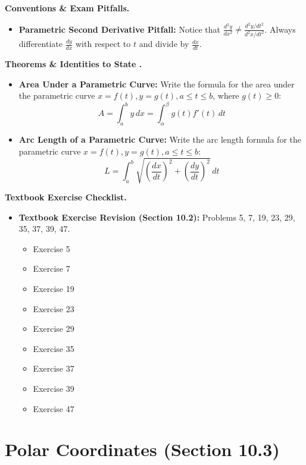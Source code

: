 \documentclass{../../../templates/natsirt}
\newcounter{topic}[section]
\newenvironment{theoremsbox}[1][]{%
    \begin{greenbox}[#1]\refstepcounter{topic}\textbf{Theorems \& Identities to State \thesection.\thetopic}%
}{\end{greenbox}}
\newenvironment{warningbox}[1][]{\begin{whitebox}[#1]\textbf{Conventions \& Exam Pitfalls. }}{\end{whitebox}}
\newenvironment{reviewbox}[1][]{\begin{whitebox}[#1]\textbf{Textbook Exercise Checklist. }}{\end{whitebox}}
\newcommand{\citem}{\item[$\square$]}
\begin{document}
\begin{warningbox}
    \begin{itemize}
        \citem \textbf{Parametric Second Derivative Pitfall:} Notice that $\frac{d^2y}{dx^2} \neq \frac{d^2y/dt^2}{d^2x/dt^2}$. Always differentiate $\frac{dy}{dx}$ with respect to $t$ and divide by $\frac{dx}{dt}$.
    \end{itemize}
\end{warningbox}

\begin{theoremsbox}
    \begin{itemize}
        \citem \textbf{Area Under a Parametric Curve:} Write the formula for the area under the parametric curve $x = f(t), y = g(t), a \le t \le b$, where $g(t) \ge 0$:
        \[ A = \int_a^b y \, dx = \int_\alpha^\beta g(t) f'(t) \, dt \]
        \citem \textbf{Arc Length of a Parametric Curve:} Write the arc length formula for the parametric curve $x = f(t), y = g(t), a \le t \le b$:
        \[ L = \int_a^b \sqrt{\left(\frac{dx}{dt}\right)^2 + \left(\frac{dy}{dt}\right)^2} \, dt \]
    \end{itemize}
\end{theoremsbox}

\begin{reviewbox}
    \begin{itemize}
        \citem \textbf{Textbook Exercise Revision (Section 10.2):} Problems 5, 7, 19, 23, 29, 35, 37, 39, 47.
        \begin{itemize}
            \citem Exercise 5
            \citem Exercise 7
            \citem Exercise 19
            \citem Exercise 23
            \citem Exercise 29
            \citem Exercise 35
            \citem Exercise 37
            \citem Exercise 39
            \citem Exercise 47
        \end{itemize}
    \end{itemize}
\end{reviewbox}

\section{Polar Coordinates (Section 10.3)}
\end{document}
